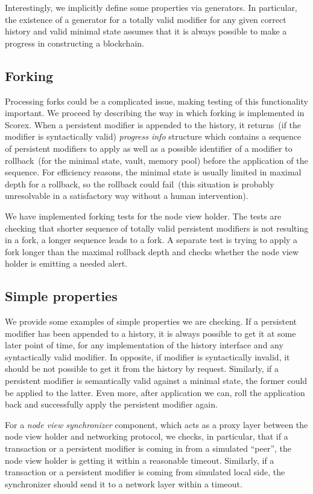 Interestingly, we implicitly define some properties via generators. In particular, the existence of a generator for a totally valid modifier for any given correct history and valid minimal state assumes that it is always possible to make a progress in constructing a blockchain.

\subsection{Forking}
\label{sec:forking}

Processing forks could be a complicated issue, making testing of this functionality important. We proceed by describing the way in which forking is implemented in Scorex. When a persistent modifier is appended to the history, it returns~(if the modifier is syntactically valid) {\em progress info} structure which contains a sequence of persistent modifiers to apply as well as a possible identifier of a modifier to rollback~(for the minimal state, vault, memory pool) before the application of the sequence. For efficiency reasons, the minimal state is usually limited in maximal depth for a rollback, so the rollback could fail~(this situation is probably unresolvable in a satisfactory way without a human intervention). 

We have implemented forking tests for the node view holder. The tests are checking that shorter sequence of totally valid persistent modifiers is not resulting in a fork, a longer sequence leads to a fork. A separate test is trying to apply a fork longer than the maximal rollback depth and checks whether the node view holder is emitting a needed alert.


\subsection{Simple properties}
\label{sec:simple-props}

We provide some examples of simple properties we are checking. If a persistent modifier has been appended to a history, it is always possible to get it at some later point of time, for any implementation of the history interface and any syntactically valid modifier. In opposite, if modifier is syntactically invalid, it should be not possible to get it from the history by request. Similarly, if a persistent modifier is semantically valid against a minimal state, the former could be applied to the latter. Even more, after application we can, roll the application back and successfully apply the persistent modifier again.  

For a {\em node view synchronizer} component, which acts as a proxy layer between the node view holder and networking protocol, we checks, in particular, that if a transaction or a persistent modifier is coming in from a simulated ``peer'', the node view holder is getting it within a reasonable timeout. Similarly, if a transaction or a persistent modifier is coming from simulated local side, the synchronizer should send it to a network layer within a timeout.